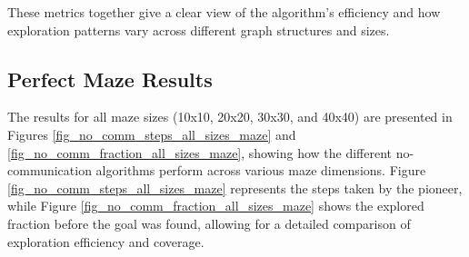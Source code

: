 These metrics together give a clear view of the algorithm's efficiency and how exploration patterns vary across different graph structures and sizes.

\subsection{Perfect Maze Results} 
\label{subsection_no_comm_maze_results}


The results for all maze sizes (10x10, 20x20, 30x30, and 40x40) are presented in Figures \ref{fig_no_comm_steps_all_sizes_maze} and \ref{fig_no_comm_fraction_all_sizes_maze}, showing how the different no-communication algorithms perform across various maze dimensions. Figure \ref{fig_no_comm_steps_all_sizes_maze} represents the steps taken by the pioneer, while Figure \ref{fig_no_comm_fraction_all_sizes_maze} shows the explored fraction before the goal was found, allowing for a detailed comparison of exploration efficiency and coverage.

